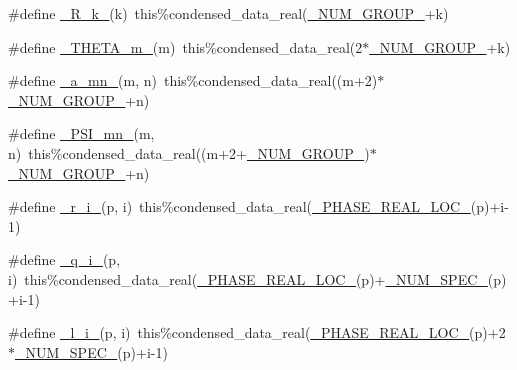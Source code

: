 \begin{DoxyCompactItemize}
\item 
\#define \mbox{\hyperlink{sub__model___u_n_i_f_a_c_8_f90_a664f44031ecdbaf6befd50e61245eb90}{\+\_\+\+R\+\_\+k\+\_\+}}(k)~this\%condensed\+\_\+data\+\_\+real(\mbox{\hyperlink{sub__model___u_n_i_f_a_c_8_f90_aaf6ff3fa100a1fa0baec9dba65df6891}{\+\_\+\+N\+U\+M\+\_\+\+G\+R\+O\+U\+P\+\_\+}}+k)
\item 
\#define \mbox{\hyperlink{sub__model___u_n_i_f_a_c_8_f90_a3a8c7266e1161aef01276f1dc86ae0b9}{\+\_\+\+T\+H\+E\+T\+A\+\_\+m\+\_\+}}(m)~this\%condensed\+\_\+data\+\_\+real(2$\ast$\mbox{\hyperlink{sub__model___u_n_i_f_a_c_8_f90_aaf6ff3fa100a1fa0baec9dba65df6891}{\+\_\+\+N\+U\+M\+\_\+\+G\+R\+O\+U\+P\+\_\+}}+k)
\item 
\#define \mbox{\hyperlink{sub__model___u_n_i_f_a_c_8_f90_a8d05b7ab46c7539147c2f20cdd779123}{\+\_\+a\+\_\+mn\+\_\+}}(m,  n)~this\%condensed\+\_\+data\+\_\+real((m+2)$\ast$\mbox{\hyperlink{sub__model___u_n_i_f_a_c_8_f90_aaf6ff3fa100a1fa0baec9dba65df6891}{\+\_\+\+N\+U\+M\+\_\+\+G\+R\+O\+U\+P\+\_\+}}+n)
\item 
\#define \mbox{\hyperlink{sub__model___u_n_i_f_a_c_8_f90_a0a2b9072316d6cb27dd50b69594f07e3}{\+\_\+\+P\+S\+I\+\_\+mn\+\_\+}}(m,  n)~this\%condensed\+\_\+data\+\_\+real((m+2+\mbox{\hyperlink{sub__model___u_n_i_f_a_c_8_f90_aaf6ff3fa100a1fa0baec9dba65df6891}{\+\_\+\+N\+U\+M\+\_\+\+G\+R\+O\+U\+P\+\_\+}})$\ast$\mbox{\hyperlink{sub__model___u_n_i_f_a_c_8_f90_aaf6ff3fa100a1fa0baec9dba65df6891}{\+\_\+\+N\+U\+M\+\_\+\+G\+R\+O\+U\+P\+\_\+}}+n)
\item 
\#define \mbox{\hyperlink{sub__model___u_n_i_f_a_c_8_f90_a3f8417fe97a9643cc5d0a2e36d4e454b}{\+\_\+r\+\_\+i\+\_\+}}(p,  i)~this\%condensed\+\_\+data\+\_\+real(\mbox{\hyperlink{sub__model___u_n_i_f_a_c_8_f90_a82db0e0fff4e8ab602fb50bebe0b7c38}{\+\_\+\+P\+H\+A\+S\+E\+\_\+\+R\+E\+A\+L\+\_\+\+L\+O\+C\+\_\+}}(p)+i-\/1)
\item 
\#define \mbox{\hyperlink{sub__model___u_n_i_f_a_c_8_f90_aa908bacca0f33ff81af11796d976d3eb}{\+\_\+q\+\_\+i\+\_\+}}(p,  i)~this\%condensed\+\_\+data\+\_\+real(\mbox{\hyperlink{sub__model___u_n_i_f_a_c_8_f90_a82db0e0fff4e8ab602fb50bebe0b7c38}{\+\_\+\+P\+H\+A\+S\+E\+\_\+\+R\+E\+A\+L\+\_\+\+L\+O\+C\+\_\+}}(p)+\mbox{\hyperlink{sub__model___u_n_i_f_a_c_8_f90_a6a6c2afb1b313ca5d982039833f5da8a}{\+\_\+\+N\+U\+M\+\_\+\+S\+P\+E\+C\+\_\+}}(p)+i-\/1)
\item 
\#define \mbox{\hyperlink{sub__model___u_n_i_f_a_c_8_f90_af1c31ccacab06f0ad67cb12af666dfd3}{\+\_\+l\+\_\+i\+\_\+}}(p,  i)~this\%condensed\+\_\+data\+\_\+real(\mbox{\hyperlink{sub__model___u_n_i_f_a_c_8_f90_a82db0e0fff4e8ab602fb50bebe0b7c38}{\+\_\+\+P\+H\+A\+S\+E\+\_\+\+R\+E\+A\+L\+\_\+\+L\+O\+C\+\_\+}}(p)+2$\ast$\mbox{\hyperlink{sub__model___u_n_i_f_a_c_8_f90_a6a6c2afb1b313ca5d982039833f5da8a}{\+\_\+\+N\+U\+M\+\_\+\+S\+P\+E\+C\+\_\+}}(p)+i-\/1)

\end{DoxyCompactItemize}
